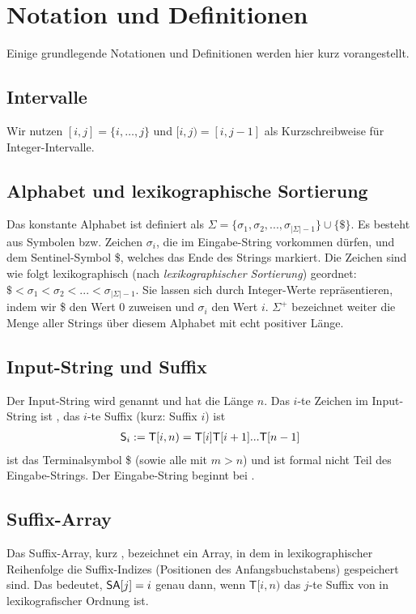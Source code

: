 \section{Notation und Definitionen}
Einige grundlegende Notationen und Definitionen werden hier kurz vorangestellt.

\subsection{Intervalle}
Wir nutzen $[i, j] = \{i, \dots, j\}$ und $[i, j) = [i, j - 1]$ als Kurzschreibweise für Integer-Intervalle.

\subsection{Alphabet und lexikographische Sortierung}
Das konstante Alphabet ist definiert als $\Sigma = \{\sigma_1, \sigma_2, ..., \sigma_{|\Sigma|-1}\} \cup \{\$\}$.
Es besteht aus Symbolen bzw. Zeichen $\sigma_i$, die im Eingabe-String vorkommen dürfen, und dem Sentinel-Symbol \$, welches das Ende des Strings markiert. 
Die Zeichen sind wie folgt lexikographisch (nach \textit{lexikographischer Sortierung})
geordnet: $\$ < \sigma_1 < \sigma_2 < ... < \sigma_{|\Sigma|-1}$. 
Sie lassen sich durch Integer-Werte repräsentieren, indem wir \$ den Wert 0 zuweisen und $\sigma_i$ den Wert $i$.
$\Sigma^+$ bezeichnet weiter die Menge aller Strings über diesem Alphabet mit echt positiver Länge.

\subsection{Input-String und Suffix}
Der Input-String wird  genannt und hat die Länge $n$. Das $i$-te Zeichen im
Input-String ist , das $i$-te Suffix  (kurz: Suffix $i$) ist 
\begin{align*}
\suffix{i} := \inputtext[i,n) = \inputtext[i]\inputtext[i+1]...\inputtext[n-1]
\end{align*} 
ist das Terminalsymbol \$ (sowie alle  mit $m>n$) und ist formal nicht Teil des Eingabe-Strings.
Der Eingabe-String beginnt bei .

\subsection{Suffix-Array}
Das Suffix-Array, kurz \sa, bezeichnet ein Array, in dem in lexikographischer Reihenfolge
die Suffix-Indizes (Positionen des Anfangsbuchstabens) gespeichert sind.
Das bedeutet, $\sa[j] = i$ genau dann, wenn $\mathsf{T}[i,n)$ das $j$-te Suffix von  in lexikografischer Ordnung ist.

